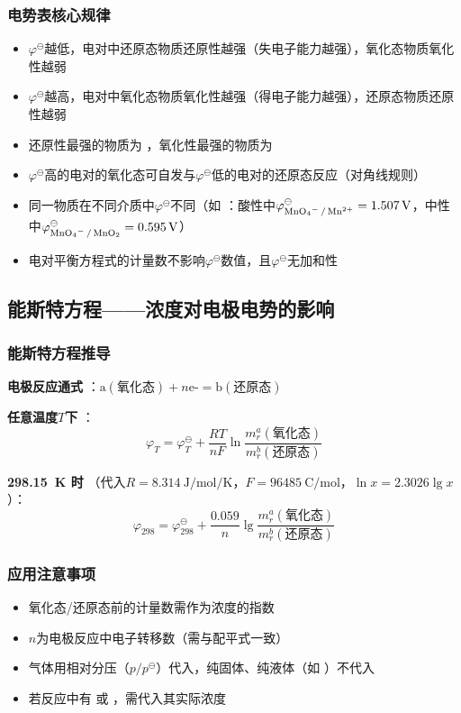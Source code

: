\subsubsection{电势表核心规律} 
\begin{itemize} 
    \item \( \varphi^\ominus \)越低，电对中还原态物质还原性越强（失电子能力越强），氧化态物质氧化性越弱
    \item \( \varphi^\ominus \)越高，电对中氧化态物质氧化性越强（得电子能力越强），还原态物质还原性越弱
    \item 还原性最强的物质为  ，氧化性最强的物质为  
    \item \( \varphi^\ominus \)高的电对的氧化态可自发与\( \varphi^\ominus \)低的电对的还原态反应（对角线规则）
    \item 同一物质在不同介质中\( \varphi^\ominus \)不同（如  ：酸性中\( \varphi_{ \ce{MnO4^- / Mn^{2+} } } ^\ominus = \qty{1.507}{\volt}  \)，中性中\( \varphi_{ \ce{MnO4^- / MnO2} } ^\ominus = \qty{0.595}{\volt}  \)）
    \item 电对平衡方程式的计量数不影响\( \varphi^\ominus \)数值，且\( \varphi^\ominus \)无加和性
\end{itemize} 

\subsection{能斯特方程——浓度对电极电势的影响} 

\subsubsection{能斯特方程推导} 
\textbf{电极反应通式} ：\(\text{a}  (\text{氧化态} ) + n\text{e-}  = \text{b}  (\text{还原态} )\)

\textbf{任意温度\( T \)下} ：
\[
\varphi_T = \varphi_T^\ominus + \frac{RT}{nF} \ln\frac{m_r^a(\text{氧化态} )}{m_r^b(\text{还原态} )} 
\]

\textbf{\qty{298.15}{\kelvin} 时} （代入\( R = \qty{8.314}{\joule\per\mol\per\kelvin}  \)，\( F = \qty{96485}{\coulomb\per\mol}  \)，\( \ln x = 2.3026\lg x \)）：
\[
\varphi_{298}  = \varphi_{298} ^\ominus + \frac{0.059}{n} \lg\frac{m_r^a(\text{氧化态} )}{m_r^b(\text{还原态} )} 
\]

\subsubsection{应用注意事项} 
\begin{itemize} 
    \item 氧化态/还原态前的计量数需作为浓度的指数
    \item \( n \)为电极反应中电子转移数（需与配平式一致）
    \item 气体用相对分压（\( p/p^\ominus \)）代入，纯固体、纯液体（如  ）不代入
    \item 若反应中有  或  ，需代入其实际浓度
\end{itemize} 

